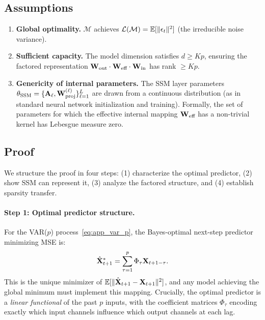 \subsection*{Assumptions}

\begin{enumerate}[label=\textbf{A\arabic*}]
    \item \label{ass:global} \textbf{Global optimality.}
    $\mathcal{M}$ achieves $\mathcal{L}(\mathcal{M}) =
    \mathbb{E}[\|\epsilon_t\|^2]$ (the irreducible noise variance).

    \item \label{ass:capacity} \textbf{Sufficient capacity.}
    The model dimension satisfies $d \geq Kp$, ensuring the
    factored representation $\mathbf{W}_{\text{out}} \cdot \mathbf{W}_{\text{eff}}
    \cdot \mathbf{W}_{\text{in}}$ has rank $\geq Kp$.

    \item \label{ass:genericity} \textbf{Genericity of internal
    parameters.} The SSM layer parameters
    $\theta_{\text{SSM}} = \{\mathbf{A}_\ell, \mathbf{W}^{(\ell)}_{\text{proj}}\}_{\ell=1}^L$
    are drawn from a continuous distribution (as in standard neural
    network initialization and training). Formally, the set of
    parameters for which the effective internal mapping
    $\mathbf{W}_{\text{eff}}$ has a non-trivial kernel has Lebesgue
    measure zero.
\end{enumerate}

\subsection*{Proof}

We structure the proof in four steps: (1) characterize the optimal
predictor, (2) show SSM can represent it, (3) analyze the factored
structure, and (4) establish sparsity transfer.

\paragraph{Step 1: Optimal predictor structure.}
For the VAR($p$) process~\eqref{eq:app_var_p}, the Bayes-optimal
next-step predictor minimizing MSE is:
\begin{equation}
    \hat{\mathbf{X}}_{t+1}^* = \sum_{\tau=1}^{p} \Phi_\tau \mathbf{X}_{t+1-\tau}.
    \label{eq:app_optimal}
\end{equation}
This is the unique minimizer of $\mathbb{E}[\|\hat{\mathbf{X}}_{t+1} - \mathbf{X}_{t+1}\|^2]$,
and any model achieving the global minimum must implement this mapping.
Crucially, the optimal predictor is a \emph{linear functional} of the
past $p$ inputs, with the coefficient matrices $\Phi_\tau$ encoding
exactly which input channels influence which output channels at each lag.

